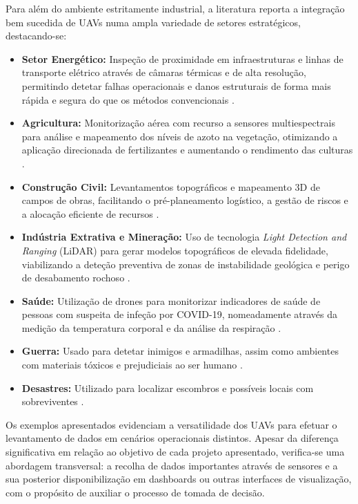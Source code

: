 \documentclass[conference,a4paper]{IEEEtran}
\begin{document}
Para além do ambiente estritamente industrial, a literatura reporta a integração bem sucedida de UAVs numa ampla variedade de setores estratégicos, destacando-se:
\begin{itemize}
    \item \textbf{Setor Energético:} Inspeção de proximidade em infraestruturas e linhas de transporte elétrico através de câmaras térmicas e de alta resolução, permitindo detetar falhas operacionais e danos estruturais de forma mais rápida e segura do que os métodos convencionais \cite{8801830}.
    \item \textbf{Agricultura:} Monitorização aérea com recurso a sensores multiespectrais para análise e mapeamento dos níveis de azoto na vegetação, otimizando a aplicação direcionada de fertilizantes e aumentando o rendimento das culturas \cite{agronomy12091992}.
    \item \textbf{Construção Civil:} Levantamentos topográficos e mapeamento 3D de campos de obras, facilitando o pré-planeamento logístico, a gestão de riscos e a alocação eficiente de recursos \cite{rs12142329}.
    \item \textbf{Indústria Extrativa e Mineração:} Uso de tecnologia \textit{Light Detection and Ranging} (LiDAR) para gerar modelos topográficos de elevada fidelidade, viabilizando a deteção preventiva de zonas de instabilidade geológica e perigo de desabamento rochoso \cite{rs18091333}.
    \item \textbf{Saúde:} Utilização de drones para monitorizar indicadores de saúde de pessoas com suspeita de infeção por COVID-19, nomeadamente através da medição da temperatura corporal e da análise da respiração \cite{jsan14050098}.
    \item \textbf{Guerra:} Usado para detetar inimigos e armadilhas, assim como ambientes com materiais tóxicos e prejudiciais ao ser humano \cite{jsan14050098}.
    \item \textbf{Desastres:} Utilizado para localizar escombros e possíveis locais com sobreviventes \cite{jsan14050098}.
\end{itemize}


Os exemplos apresentados evidenciam a versatilidade dos UAVs para efetuar o levantamento de dados em cenários operacionais distintos. Apesar da diferença significativa em relação ao objetivo de cada projeto apresentado, verifica-se uma abordagem transversal: a recolha de dados importantes através de sensores e a sua posterior disponibilização em dashboards ou outras interfaces de visualização, com o propósito de auxiliar o processo de tomada de decisão.
\end{document}
